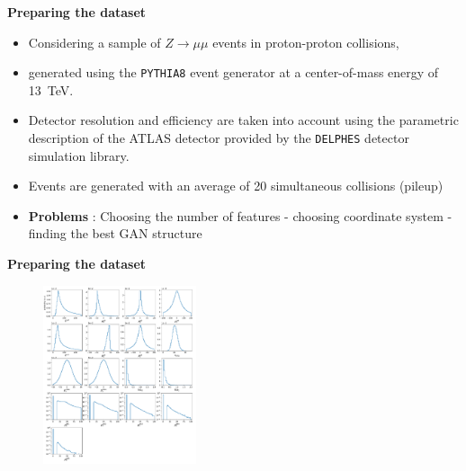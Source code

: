 \begin{frame}{\underline{\secname}}


\begin{center}
\textbf{Preparing the dataset}
\end{center}
\begin{itemize}			  \setlength\itemsep{0em}

\item
Considering a sample of $Z \to \mu \mu$ events in proton-proton collisions,
\item
generated using the {\tt PYTHIA8} event generator at a center-of-mass energy of 13~TeV.
\item
Detector resolution and efficiency are taken into account using the parametric description of the ATLAS detector provided by the {\tt DELPHES} detector simulation library.
\item
Events are generated with an average of 20 simultaneous collisions (pileup)
\item \textbf{Problems} : Choosing the number of features - choosing coordinate system - finding the best GAN structure

\end{itemize}

\end{frame}



\begin{frame}{\underline{\secname}}


\begin{center}
\textbf{Preparing the dataset}
\end{center}

\begin{figure}[H]
\begin{center}
\includegraphics[width=0.4\textwidth]{slides/plotmatrix_realonly_train}
\end{center}
\end{figure}

\end{frame}


